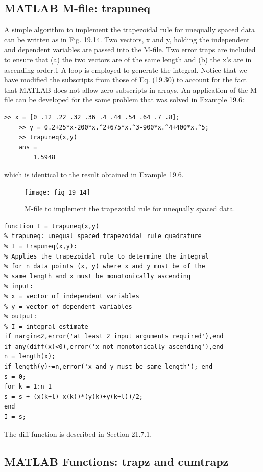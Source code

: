 \documentclass[../main.tex]{subfiles}
\begin{document}
\subsection{MATLAB M-file: trapuneq}
A simple algorithm to implement the trapezoidal rule for unequally spaced data can be
written as in Fig. 19.14. Two vectors, x and y, holding the independent and dependent variables are passed into the M-file. Two error traps are included to ensure that (a) the two vectors are of the same length and (b) the x's are in ascending order.1 A loop is employed to
generate the integral. Notice that we have modified the subscripts from those of Eq. (19.30)
to account for the fact that MATLAB does not allow zero subscripts in arrays.
An application of the M-file can be developed for the same problem that was solved in
Example 19.6:
\begin{lstlisting}[numbers=none]
	>> x = [0 .12 .22 .32 .36 .4 .44 .54 .64 .7 .8];
	>> y = 0.2+25*x-200*x.^2+675*x.^3-900*x.^4+400*x.^5;
	>> trapuneq(x,y)
	ans =
		1.5948
\end{lstlisting}
which is identical to the result obtained in Example 19.6.

\begin{figure}[H]
    \centering
    \texttt{[image: fig\_19\_14]}
   \caption{\textsf{M-file to implement the trapezoidal rule for unequally spaced data.}}\label{fig:fig_19_14}
\end{figure}

\begin{lstlisting}[numbers=none]
function I = trapuneq(x,y)
% trapuneq: unequal spaced trapezoidal rule quadrature
% I = trapuneq(x,y):
% Applies the trapezoidal rule to determine the integral
% for n data points (x, y) where x and y must be of the
% same length and x must be monotonically ascending
% input:
% x = vector of independent variables
% y = vector of dependent variables
% output:
% I = integral estimate
if nargin<2,error('at least 2 input arguments required'),end
if any(diff(x)<0),error('x not monotonically ascending'),end
n = length(x);
if length(y)~=n,error('x and y must be same length'); end
s = 0;
for k = 1:n-1
s = s + (x(k+l)-x(k))*(y(k)+y(k+l))/2;
end
I = s; 
\end{lstlisting}
The diff function is described in Section 21.7.1.

\subsection{ MATLAB Functions: trapz and cumtrapz}
\end{document}

